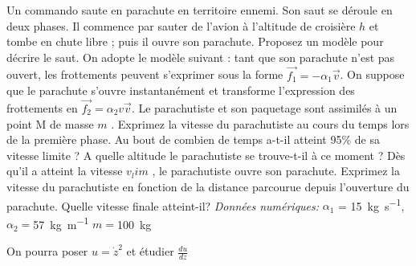 \begin{Exercise}[title=Parachutiste]
	Un commando saute en parachute en territoire ennemi. Son saut se déroule en deux phases. Il commence par sauter de l'avion à l'altitude de croisière $h$ et tombe en chute libre ; puis il ouvre son parachute.
	\Question Proposez un modèle pour décrire le saut.
	On adopte le modèle suivant : tant que son parachute n'est pas ouvert, les frottements peuvent s'exprimer sous la forme $\vec{f_1}= -\alpha_1 \vec{v}$. On suppose que le parachute s'ouvre instantanément et transforme l'expression des frottements en $\vec{f_2} = \alpha_2 v \vec{v}$. Le parachutiste et son paquetage sont assimilés à un point M de masse $m$ .
	\Question Exprimez la vitesse du parachutiste au cours du temps lors de la première phase. Au bout de combien de
	temps a-t-il atteint 95\% de sa vitesse limite ? A quelle altitude le parachutiste se trouve-t-il à ce moment ?
	\Question Dès qu'il a atteint la vitesse $v_lim$ , le parachutiste ouvre son parachute. Exprimez la vitesse du parachutiste en	fonction de la distance parcourue depuis l'ouverture du parachute. Quelle vitesse finale atteint-il?
	\emph{Données numériques:} $\alpha_1$ = \SI{15}{\kg\per\s}, $\alpha_2 = $\SI{57}{\kg\per\m} $m=$\SI{100}{kg}
\end{Exercise}
\begin{Answer}
	On pourra poser $u= \dot{z}^2$ et étudier $\frac{du}{dz}$
\end{Answer}
